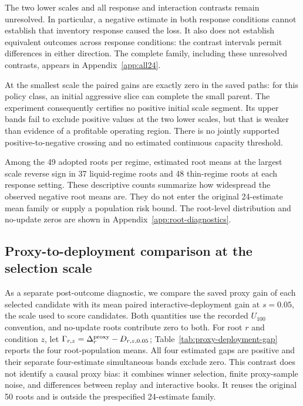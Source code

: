 \documentclass[10pt,letterpaper]{article}
\begin{document}
The two lower scales and all response and interaction contrasts remain unresolved. In particular, a negative estimate in both response conditions cannot establish that inventory response caused the loss. It also does not establish equivalent outcomes across response conditions: the contrast intervals permit differences in either direction. The complete family, including these unresolved contrasts, appears in Appendix~\ref{app:all24}.

At the smallest scale the paired gains are exactly zero in the saved paths: for this policy class, an initial aggressive slice can complete the small parent. The experiment consequently certifies no positive initial scale segment. Its upper bands fail to exclude positive values at the two lower scales, but that is weaker than evidence of a profitable operating region. There is no jointly supported positive-to-negative crossing and no estimated continuous capacity threshold.

Among the 49 adopted roots per regime, estimated root means at the largest scale reverse sign in 37 liquid-regime roots and 48 thin-regime roots at each response setting. These descriptive counts summarize how widespread the observed negative root means are. They do not enter the original 24-estimate mean family or supply a population risk bound. The root-level distribution and no-update zeros are shown in Appendix~\ref{app:root-diagnostics}.

\subsection{Proxy-to-deployment comparison at the selection scale}
As a separate post-outcome diagnostic, we compare the saved proxy gain of each selected candidate with its mean paired interactive-deployment gain at $s=0.05$, the scale used to score candidates. Both quantities use the recorded $U_{100}$ convention, and no-update roots contribute zero to both. For root $r$ and condition $z$, let $\Gamma_{r,z}=\Delta^{\rm proxy}_{r}-D_{r,z,0.05}$; Table~\ref{tab:proxy-deployment-gap} reports the four root-population means. All four estimated gaps are positive and their separate four-estimate simultaneous bands exclude zero. This contrast does not identify a causal proxy bias: it combines winner selection, finite proxy-sample noise, and differences between replay and interactive books. It reuses the original 50 roots and is outside the prespecified 24-estimate family.

\end{document}
